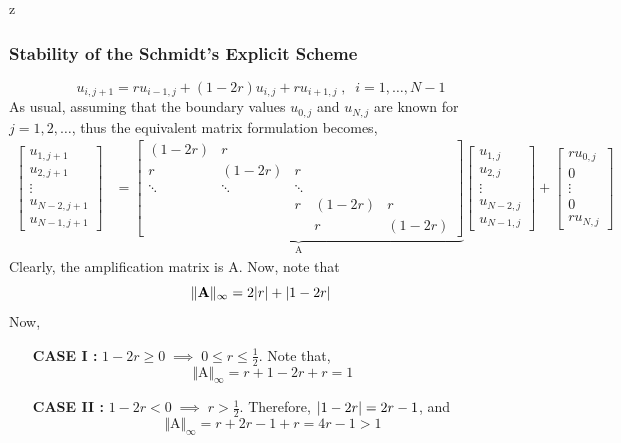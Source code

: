 z\documentclass[a4paper,12pt,twoside]{book}
\newcommand{\nll}[0]{\newline\newline}
\DeclarePairedDelimiter\abs{\lvert}{\rvert}
\newcommand{\mat}[1]{\bm{\mathrm{#1}}}
\newcommand{\norm}[1]{\Vert #1 \Vert}
\begin{document}
\subsubsection{Stability of the Schmidt's Explicit Scheme}
\[u_{i,j+1} = ru_{i-1,j} + (1-2r)u_{i,j} + ru_{i+1,j}\;,\;\;i=1,\dots,N-1\]
As usual, assuming that the boundary values $u_{0,j}$ and $u_{N,j}$ are known for $j=1,2,\dots$, thus the equivalent matrix formulation becomes,
\begin{equation*}
    \begin{split}
        \begin{bmatrix}
            u_{1,j+1}\\
            u_{2,j+1}\\
            \vdots\\
            u_{N-2,j+1}\\
            u_{N-1,j+1}
        \end{bmatrix} &= \underbrace{\begin{bmatrix}
            (1-2r) & r &  &  &  \\
            r & (1-2r) & r &  &  \\
            \ddots & \ddots & \ddots  &  &  \\
             &  & r & (1-2r) & r \\
              &  &  & r & (1-2r) 
        \end{bmatrix}}_{\mat{A}} \begin{bmatrix}
            u_{1,j}\\
            u_{2,j}\\
            \vdots\\
            u_{N-2,j}\\
            u_{N-1,j}
        \end{bmatrix} + \begin{bmatrix}
            ru_{0,j}\\
            0\\
            \vdots\\
            0\\
            ru_{N,j}
        \end{bmatrix}
    \end{split}
\end{equation*}
Clearly, the amplification matrix is $\mat{A}$.
\nll
Now, note that 
\[\norm{\mat{A}}_\infty = 2\abs{r} + \abs{1-2r}\]
Now,
\begin{itemize}
    \item[\textbf{CASE I : }]{$1-2r \ge 0 \;\implies\; 0\le r\le \frac{1}{2}$.
    \nll
    Note that,
    \[\norm{\mat{A}}_\infty = r+ 1-2r +r = 1\]
    } 
    \item[\textbf{CASE II : }]{$1-2r < 0 \; \implies\; r > \frac{1}{2}$.
    \nll
    Therefore, $\abs{1-2r} = 2r-1$, and
    \[\norm{\mat{A}}_\infty = r+ 2r-1 + r = 4r-1 > 1\]
    }
\end{itemize}
\end{document}
